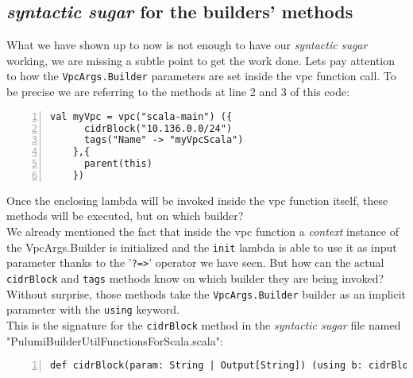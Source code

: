 \subsection{\textit{syntactic sugar} for the builders' methods}
\label{ssec:syn-sug-builders}
What we have shown up to now is not enough to have our \textit{syntactic sugar} working, we are missing a subtle point to get the work done.
Lets pay attention to how the \texttt{VpcArgs.Builder} parameters are set inside the vpc function call.
To be precise we are referring to the methods at line 2 and 3 of this code:\\
\begin{minipage}{\linewidth}
  \begin{lstlisting}[numbers=left, numberstyle=\tiny, numbersep=-5pt, stepnumber=1]
    val myVpc = vpc("scala-main") ({
      cidrBlock("10.136.0.0/24")
      tags("Name" -> "myVpcScala")
    },{
      parent(this)
    })
  \end{lstlisting}
\end{minipage}
Once the enclosing lambda will be invoked inside the vpc function itself, these methods will be executed, but on which builder?\\
We already mentioned the fact that inside the vpc function a \textit{context} instance of the VpcArgs.Builder is initialized and the \texttt{init} lambda is able to use it as input parameter thanks to the '\texttt{?=>}' operator we have seen.
But how can the actual \texttt{cidrBlock} and \texttt{tags} methods know on which builder they are being invoked?\\
Without surprise, those methods take the \texttt{VpcArgs.Builder} builder as an implicit parameter with the \texttt{using} keyword.\\
This is the signature for the \texttt{cidrBlock} method in the \textit{syntactic sugar} file named "PulumiBuilderUtilFunctionsForScala.scala":\\
\begin{minipage}{\linewidth}
\begin{lstlisting}[numbers=left, numberstyle=\tiny, numbersep=-5pt, stepnumber=1, linewidth=420pt]
  def cidrBlock(param: String | Output[String]) (using b: cidrBlockOwners): Unit
\end{lstlisting}
\end{minipage}
